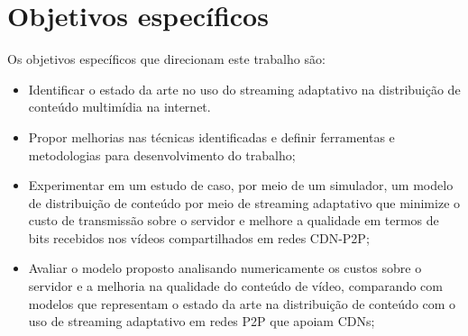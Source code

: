 \documentclass[
	12pt,				%
	oneside,			%
	a4paper,			%
	english,			%
	brazil				%
	]{abntex2ppgsi}
\begin{document}


\section{Objetivos específicos}

Os objetivos específicos que direcionam este trabalho são:

\begin{itemize}
\item	Identificar o estado da arte no uso do streaming adaptativo na distribuição de conteúdo multimídia na internet.
\item 	Propor melhorias nas técnicas identificadas e definir ferramentas e metodologias para desenvolvimento do trabalho;
\item 	Experimentar em um estudo de caso, por meio de um simulador, um modelo de distribuição de conteúdo por meio de streaming adaptativo que minimize o custo de transmissão sobre o servidor e melhore a qualidade em termos de bits recebidos nos vídeos compartilhados em redes CDN-P2P;
\item 	Avaliar o modelo proposto analisando numericamente os custos sobre o servidor e a melhoria na qualidade do conteúdo de vídeo, comparando com modelos que representam o estado da arte na distribuição de conteúdo com o uso de streaming adaptativo em redes P2P que apoiam CDNs;
\end{itemize}
\end{document}
